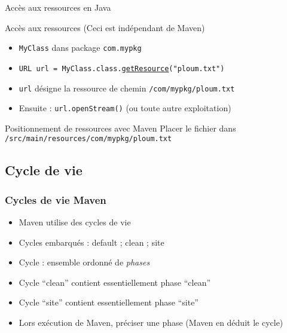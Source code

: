 \documentclass[english, french]{beamer}
\begin{document}
\begin{frame}{Accès aux ressources en Java}
	\begin{block}{Accès aux ressources}
		(Ceci est indépendant de Maven)
		\begin{itemize}
			\item \texttt{MyClass} dans package \texttt{com.mypkg}
			\item \texttt{URL url = MyClass.class.\href{https://docs.oracle.com/javase/8/docs/api/java/lang/Class.html\#getResource-java.lang.String-}{getResource}("ploum.txt")}
			\item \texttt{url} désigne la ressource de chemin \texttt{/com/mypkg/ploum.txt}
			\item Ensuite : \texttt{url.openStream()} (ou toute autre exploitation)
		\end{itemize}
	\end{block}
	\begin{block}{Positionnement de ressources avec Maven}
		Placer le fichier dans \texttt{/src/main/resources/com/mypkg/ploum.txt}
	\end{block}
\end{frame}

\subsection{Cycle de vie}
\begin{frame}
	\frametitle{Cycles de vie Maven}
	\begin{itemize}
		\item Maven utilise des cycles de vie
		\item Cycles embarqués : default ; clean ; site
		\item Cycle : ensemble ordonné de \emph{phases}
		\item Cycle “clean” contient {\tiny essentiellement} phase “clean”
		\item Cycle “site” contient {\tiny essentiellement} phase “site”
		\item Lors exécution de Maven, préciser une phase (Maven en déduit le cycle)
	\end{itemize}
\end{frame}
\end{document}
